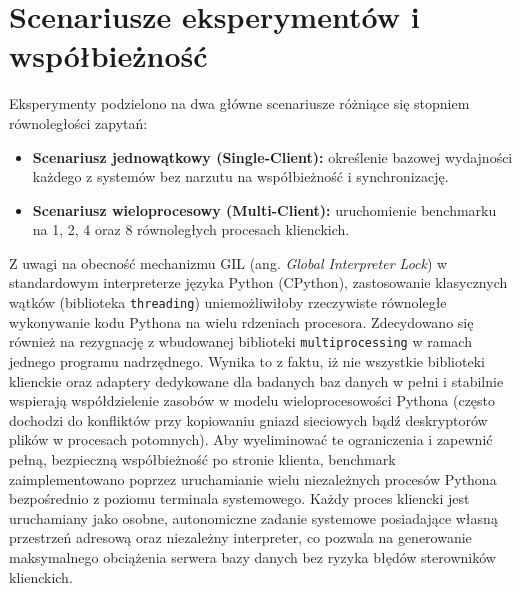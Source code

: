 
\section{Scenariusze eksperymentów i współbieżność}
Eksperymenty podzielono na dwa główne scenariusze różniące się stopniem równoległości zapytań:
\begin{itemize}
    \item \textbf{Scenariusz jednowątkowy (Single-Client):} określenie bazowej wydajności każdego z systemów bez narzutu na współbieżność i synchronizację.
    \item \textbf{Scenariusz wieloprocesowy (Multi-Client):} uruchomienie benchmarku na 1, 2, 4 oraz 8 równoległych procesach klienckich.
\end{itemize}
Z uwagi na obecność mechanizmu GIL (ang. \emph{Global Interpreter Lock}) w standardowym interpreterze języka Python (CPython), zastosowanie klasycznych wątków (biblioteka \texttt{threading}) uniemożliwiłoby rzeczywiste równoległe wykonywanie kodu Pythona na wielu rdzeniach procesora. Zdecydowano się również na rezygnację z wbudowanej biblioteki \texttt{multiprocessing} w ramach jednego programu nadrzędnego. Wynika to z faktu, iż nie wszystkie biblioteki klienckie oraz adaptery dedykowane dla badanych baz danych w pełni i stabilnie wspierają współdzielenie zasobów w modelu wieloprocesowości Pythona (często dochodzi do konfliktów przy kopiowaniu gniazd sieciowych bądź deskryptorów plików w procesach potomnych). Aby wyeliminować te ograniczenia i zapewnić pełną, bezpieczną współbieżność po stronie klienta, benchmark zaimplementowano poprzez uruchamianie wielu niezależnych procesów Pythona bezpośrednio z poziomu terminala systemowego. Każdy proces kliencki jest uruchamiany jako osobne, autonomiczne zadanie systemowe posiadające własną przestrzeń adresową oraz niezależny interpreter, co pozwala na generowanie maksymalnego obciążenia serwera bazy danych bez ryzyka błędów sterowników klienckich.

